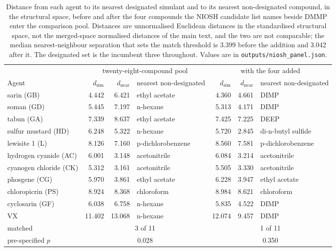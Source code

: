 \begin{table}[htb]
\centering
\caption{Distance from each agent to its nearest designated simulant and to its nearest non-designated compound, in the structural space, before and after the four compounds the NIOSH candidate list names beside DMMP enter the comparison pool. Distances are unnormalised Euclidean distances in the standardised structural space, not the merged-space normalised distances of the main text, and the two are not comparable; the median nearest-neighbour separation that sets the match threshold is 3.399 before the addition and 3.042 after it. The designated set is the incumbent three throughout. Values are in \texttt{outputs/niosh\_panel.json}.}
\label{tab:niosh}
\footnotesize
\setlength{\tabcolsep}{3pt}
\begin{tabular}{lrrlrrl}
\hline
 & \multicolumn{3}{c}{twenty-eight-compound pool} & \multicolumn{3}{c}{with the four added} \\
\cline{2-4}\cline{5-7}
Agent & $d_{\mathrm{sim}}$ & $d_{\mathrm{near}}$ & nearest non-designated & $d_{\mathrm{sim}}$ & $d_{\mathrm{near}}$ & nearest non-designated \\
\hline
sarin (GB) & 4.442 & 6.421 & ethyl acetate & 4.360 & 4.661 & DIMP \\
soman (GD) & 5.445 & 7.197 & n-hexane & 5.313 & 4.171 & DIMP \\
tabun (GA) & 7.339 & 8.637 & ethyl acetate & 7.425 & 7.225 & DEEP \\
sulfur mustard (HD) & 6.248 & 5.322 & n-hexane & 5.720 & 2.845 & di-n-butyl sulfide \\
lewisite 1 (L) & 8.126 & 7.160 & p-dichlorobenzene & 8.560 & 7.581 & p-dichlorobenzene \\
hydrogen cyanide (AC) & 6.001 & 3.148 & acetonitrile & 6.084 & 3.214 & acetonitrile \\
cyanogen chloride (CK) & 5.312 & 3.161 & acetonitrile & 5.505 & 3.330 & acetonitrile \\
phosgene (CG) & 5.970 & 3.861 & ethyl acetate & 6.228 & 3.947 & ethyl acetate \\
chloropicrin (PS) & 8.924 & 8.368 & chloroform & 8.984 & 8.621 & chloroform \\
cyclosarin (GF) & 6.038 & 6.758 & n-hexane & 5.835 & 4.522 & DIMP \\
VX & 11.402 & 13.068 & n-hexane & 12.074 & 9.457 & DIMP \\
\hline
matched & \multicolumn{3}{c}{3 of 11} & \multicolumn{3}{c}{1 of 11} \\
pre-specified $p$ & \multicolumn{3}{c}{0.028} & \multicolumn{3}{c}{0.350} \\
\hline
\end{tabular}
\end{table}
